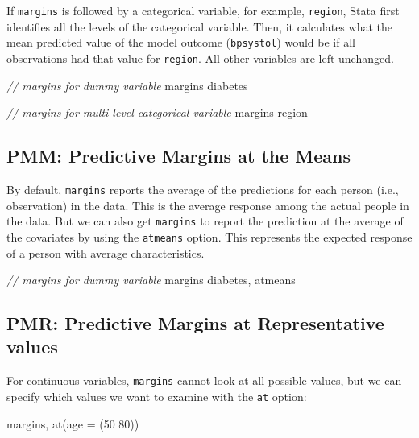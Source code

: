 \documentclass[
]{book}
\newenvironment{Shaded}{\begin{snugshade}}{\end{snugshade}}
\newcommand{\CommentTok}[1]{\textcolor[rgb]{0.56,0.35,0.01}{\textit{#1}}}
\newcommand{\FunctionTok}[1]{\textcolor[rgb]{0.00,0.00,0.00}{#1}}
\newcommand{\NormalTok}[1]{#1}
\begin{document}
If \texttt{margins} is followed by a categorical variable, for example, \texttt{region}, Stata first identifies all the levels of the categorical variable. Then, it calculates what the mean predicted value of the model outcome (\texttt{bpsystol}) would be if all observations had that value for \texttt{region}. All other variables are left unchanged.

\begin{Shaded}
\begin{Highlighting}[]
\CommentTok{// margins for dummy variable }
\NormalTok{margins diabetes}

\CommentTok{// margins for multi{-}level categorical variable }
\NormalTok{margins region}
\end{Highlighting}
\end{Shaded}

\hypertarget{pmm-predictive-margins-at-the-means}{%
\subsection{PMM: Predictive Margins at the Means}\label{pmm-predictive-margins-at-the-means}}

By default, \texttt{margins} reports the average of the predictions for each person (i.e., observation) in the data. This is the average response among the actual people in the data. But we can also get \texttt{margins} to report the prediction at the average of the covariates by using the \texttt{atmeans} option. This represents the expected response of a person with average characteristics.

\begin{Shaded}
\begin{Highlighting}[]
\CommentTok{// margins for dummy variable }
\NormalTok{margins diabetes, atmeans}
\end{Highlighting}
\end{Shaded}

\hypertarget{pmr-predictive-margins-at-representative-values}{%
\subsection{PMR: Predictive Margins at Representative values}\label{pmr-predictive-margins-at-representative-values}}

For continuous variables, \texttt{margins} cannot look at all possible values, but we can specify which values we want to examine with the \texttt{at} option:

\begin{Shaded}
\begin{Highlighting}[]
\NormalTok{margins, }\FunctionTok{at}\NormalTok{(age = (50 80))}
\end{Highlighting}
\end{Shaded}
\end{document}
